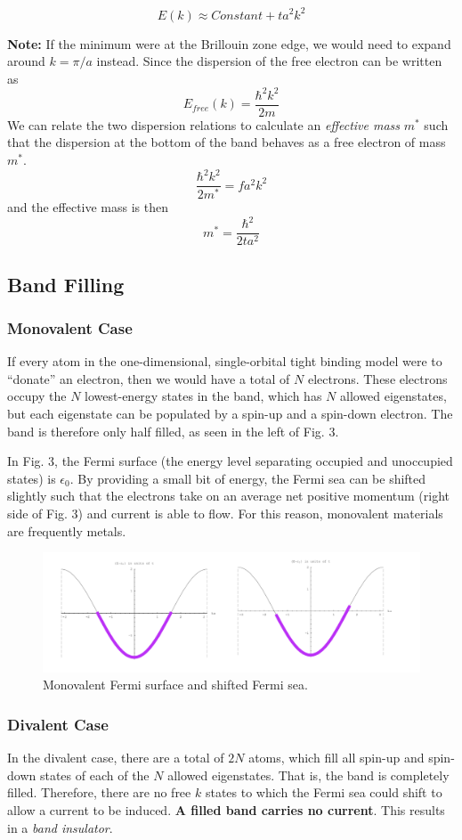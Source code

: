 \documentclass[10pt]{article}
\begin{document}
$$
E(k) \approx Constant + ta^{2}k^{2}
$$

\textbf{Note:} If the minimum were at the Brillouin zone edge, we would need to expand around $k = \pi/a$ instead.
Since the dispersion of the free electron can be written as
$$E_{free}(k) = \frac{\hbar^{2}k^{2}}{2m}$$
We can relate the two dispersion relations to calculate an \emph{effective mass} $m^{*}$ such that the dispersion at
the bottom of the band behaves as a free electron of mass $m^{*}$.
$$
\frac{\hbar^{2}k^{2}}{2m^{*}} = fa^{2}k^{2}
$$
and the effective mass is then
$$
m^{*} = \frac{\hbar^{2}}{2ta^{2}}
$$

\subsection{Band Filling}
\subsubsection{Monovalent Case}
If every atom in the one-dimensional, single-orbital tight binding model were to ``donate'' an electron,
then we would have a total of $N$ electrons. These electrons occupy the $N$ lowest-energy states in the band,
which has $N$ allowed eigenstates, but each eigenstate can be populated by a spin-up and a spin-down electron.
The band is therefore only half filled, as seen in the left of Fig. 3.

In Fig. 3, the Fermi surface (the energy level separating occupied and unoccupied states) is $\epsilon_{0}$. By providing a small bit of
energy, the Fermi sea can be shifted slightly such that the electrons take on an average net positive momentum (right side of Fig. 3) and
current is able to flow. For this reason, monovalent materials are frequently metals.

\begin{figure}
  \centering
    \includegraphics[width=\textwidth]{tb3}
    \caption{Monovalent Fermi surface and shifted Fermi sea.}
\end{figure}

\subsubsection{Divalent Case}
In the divalent case, there are a total of $2N$ atoms, which fill all spin-up and spin-down states of each of the $N$ allowed
eigenstates. That is, the band is completely filled. Therefore, there are no free $k$ states to which the Fermi sea could shift to allow a current to
be induced. \textbf{A filled band carries no current}. This results in a \emph{band insulator}.
\end{document}
